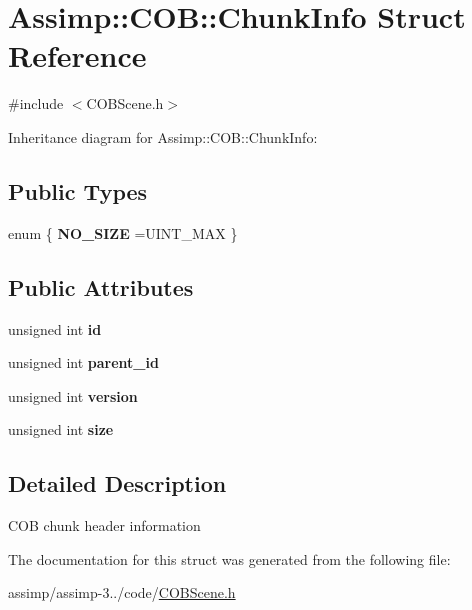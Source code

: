 \hypertarget{struct_assimp_1_1_c_o_b_1_1_chunk_info}{\section{Assimp\+:\+:C\+O\+B\+:\+:Chunk\+Info Struct Reference}
\label{struct_assimp_1_1_c_o_b_1_1_chunk_info}
}


{\ttfamily \#include $<$C\+O\+B\+Scene.\+h$>$}



Inheritance diagram for Assimp\+:\+:C\+O\+B\+:\+:Chunk\+Info\+:
\subsection*{Public Types}
\begin{DoxyCompactItemize}
\item 
\hypertarget{struct_assimp_1_1_c_o_b_1_1_chunk_info_a48d6e9293e95d53f48b7a9d079f3131f}{enum \{ {\bfseries N\+O\+\_\+\+S\+I\+Z\+E} =U\+I\+N\+T\+\_\+\+M\+A\+X
 \}}\label{struct_assimp_1_1_c_o_b_1_1_chunk_info_a48d6e9293e95d53f48b7a9d079f3131f}

\end{DoxyCompactItemize}
\subsection*{Public Attributes}
\begin{DoxyCompactItemize}
\item 
\hypertarget{struct_assimp_1_1_c_o_b_1_1_chunk_info_ac4ff81f5846a68526bddd8ce71ff8f6b}{unsigned int {\bfseries id}}\label{struct_assimp_1_1_c_o_b_1_1_chunk_info_ac4ff81f5846a68526bddd8ce71ff8f6b}

\item 
\hypertarget{struct_assimp_1_1_c_o_b_1_1_chunk_info_ad596851db0f5b5cd0bc939e23c76dabf}{unsigned int {\bfseries parent\+\_\+id}}\label{struct_assimp_1_1_c_o_b_1_1_chunk_info_ad596851db0f5b5cd0bc939e23c76dabf}

\item 
\hypertarget{struct_assimp_1_1_c_o_b_1_1_chunk_info_a7064172fcec2063cd5a61083637ea199}{unsigned int {\bfseries version}}\label{struct_assimp_1_1_c_o_b_1_1_chunk_info_a7064172fcec2063cd5a61083637ea199}

\item 
\hypertarget{struct_assimp_1_1_c_o_b_1_1_chunk_info_a712fc4469756f3cca5e806657cf8c205}{unsigned int {\bfseries size}}\label{struct_assimp_1_1_c_o_b_1_1_chunk_info_a712fc4469756f3cca5e806657cf8c205}

\end{DoxyCompactItemize}


\subsection{Detailed Description}
C\+O\+B chunk header information 

The documentation for this struct was generated from the following file\+:\begin{DoxyCompactItemize}
\item 
assimp/assimp-\/3../code/\hyperlink{_c_o_b_scene_8h}{C\+O\+B\+Scene.\+h}\end{DoxyCompactItemize}
